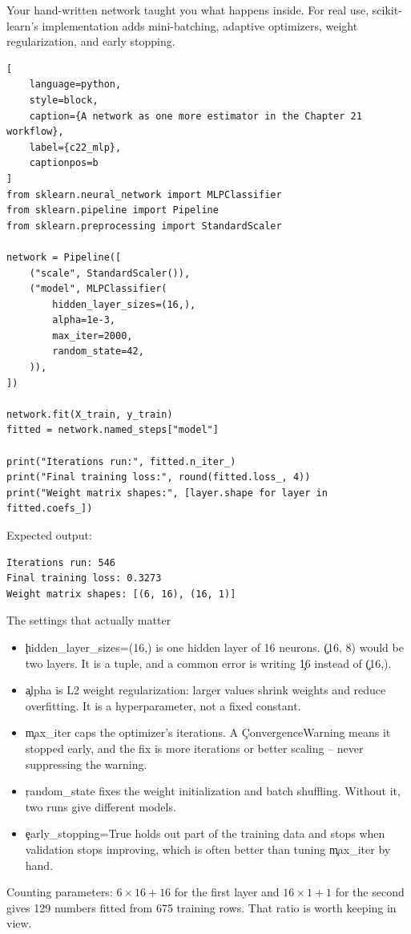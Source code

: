 
Your hand-written network taught you what happens inside. For real use,
scikit-learn's implementation adds mini-batching, adaptive optimizers, weight
regularization, and early stopping.

\begin{lstlisting}[
    language=python,
    style=block,
    caption={A network as one more estimator in the Chapter 21 workflow},
    label={c22_mlp},
    captionpos=b
]
from sklearn.neural_network import MLPClassifier
from sklearn.pipeline import Pipeline
from sklearn.preprocessing import StandardScaler

network = Pipeline([
    ("scale", StandardScaler()),
    ("model", MLPClassifier(
        hidden_layer_sizes=(16,),
        alpha=1e-3,
        max_iter=2000,
        random_state=42,
    )),
])

network.fit(X_train, y_train)
fitted = network.named_steps["model"]

print("Iterations run:", fitted.n_iter_)
print("Final training loss:", round(fitted.loss_, 4))
print("Weight matrix shapes:", [layer.shape for layer in fitted.coefs_])
\end{lstlisting}

Expected output:

\begin{lstlisting}[language=text, style=block, caption={A 129-parameter network}, label={c22_mlp_output}, captionpos=b]
Iterations run: 546
Final training loss: 0.3273
Weight matrix shapes: [(6, 16), (16, 1)]
\end{lstlisting}

\begin{SyntaxBox}{The settings that actually matter}
\begin{itemize}
    \item \c{hidden_layer_sizes=(16,)} is one hidden layer of 16 neurons.
          \c{(16, 8)} would be two layers. It is a tuple, and a common error is
          writing \c{16} instead of \c{(16,)}.
    \item \c{alpha} is L2 weight regularization: larger values shrink weights and
          reduce overfitting. It is a hyperparameter, not a fixed constant.
    \item \c{max_iter} caps the optimizer's iterations. A
          \c{ConvergenceWarning} means it stopped early, and the fix is more
          iterations or better scaling -- never suppressing the warning.
    \item \c{random_state} fixes the weight initialization and batch shuffling.
          Without it, two runs give different models.
    \item \c{early_stopping=True} holds out part of the training data and stops
          when validation stops improving, which is often better than tuning
          \c{max_iter} by hand.
\end{itemize}
Counting parameters: $6 \times 16 + 16$ for the first layer and
$16 \times 1 + 1$ for the second gives 129 numbers fitted from 675 training rows.
That ratio is worth keeping in view.
\end{SyntaxBox}

